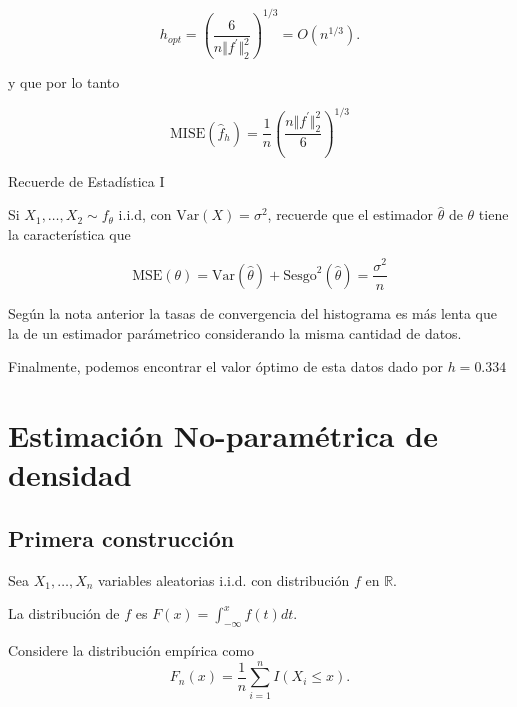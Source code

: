 \documentclass[12pt]{book}\usepackage[]{graphicx}\usepackage[]{color}
\theoremstyle{definition}
\theoremstyle{plain}
\begin{document}
\begin{equation*}
	h_{opt} = \left(\frac{6}{n\Vert f^\prime\Vert_{2}^2}\right) ^{1/3} = O\left( n^{1/3} \right).
\end{equation*}

y que por lo tanto

\begin{equation*}
	\mathrm{MISE}(\hat{f}_{h}) = \frac{1}{n} \left(\frac{n\Vert f^\prime\Vert_{2}^2}{6}\right)  ^{1/3}
\end{equation*}

\begin{nota}{Recuerde de Estadística I}{}

	Si \(X_1, \ldots, X_2 \sim f_{\theta} \) i.i.d, con \(\mathrm{Var}(X) = \sigma^2\), recuerde que el estimador \(\hat{\theta}\)  de \(\theta\) tiene la característica que

	\begin{equation*}
		\mathrm{MSE}(\theta) = \mathrm{Var}(\hat{\theta}) +
		\mathrm{Sesgo}^2(\hat{\theta}) = \frac{\sigma^2}{n}
	\end{equation*}
\end{nota}

Según la nota anterior la tasas de convergencia del histograma es más lenta que la de un estimador parámetrico considerando la misma cantidad de datos.





Finalmente, podemos encontrar el valor óptimo  de esta datos dado por $h=0.334$



\newpage

\section{Estimación No-paramétrica de densidad}

\subsection{Primera construcción}

Sea $X_{1},\ldots,X_{n}$ variables aleatorias i.i.d. con distribución $f$ en $\mathbb{R}$.

La distribución de  $f$ es  $F(x)=\int_{-\infty}^{x}f(t)dt$.

Considere la distribución empírica como
\[
	F_{n}(x)=\frac{1}{n}\sum_{i=1}^{n}I(X_{i}\leq x).
\]
\end{document}
